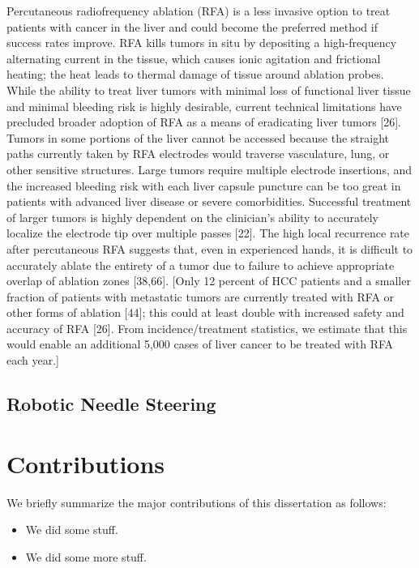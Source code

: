 Percutaneous radiofrequency ablation (RFA) is a less invasive option to treat patients with cancer in the liver and could become the preferred method if success rates improve. RFA kills tumors in situ by depositing a high-frequency alternating current in the tissue, which causes ionic agitation and frictional heating; the heat leads to thermal damage of tissue around ablation probes. While the ability to treat liver tumors with minimal loss of functional liver tissue and minimal bleeding risk is highly desirable, current technical limitations have precluded broader adoption of RFA as a means of eradicating liver tumors [26]. Tumors in some portions of the liver cannot be accessed because the straight paths currently taken by RFA electrodes would traverse vasculature, lung, or other sensitive structures. Large tumors require multiple electrode insertions, and the increased bleeding risk with each liver capsule puncture can be too great in patients with advanced liver disease or severe comorbidities. Successful treatment of larger tumors is highly dependent on the clinician’s ability to accurately localize the electrode tip over multiple passes [22]. The high local recurrence rate after percutaneous RFA suggests that, even in experienced hands, it is difficult to accurately ablate the entirety of a tumor due to failure to achieve appropriate overlap of ablation zones [38,66]. [Only 12 percent of HCC patients and a smaller fraction of patients with metastatic tumors are currently treated with RFA or other forms of ablation [44]; this could at least double with increased safety and accuracy of RFA [26]. From incidence/treatment statistics, we estimate that this would enable an additional 5,000 cases of liver cancer to be treated with RFA each year.]

\subsection{Robotic Needle Steering}

\section{Contributions}
We briefly summarize the major contributions of this dissertation as follows:
\begin{itemize}
\item We did some stuff.
\item We did some more stuff.
\end{itemize}


